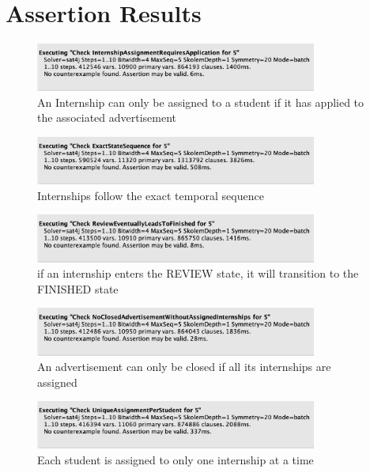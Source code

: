 \section{Assertion Results}

\begin{figure}[H]
    \centering
    \includegraphics[width=350px]{../assets/alloy-assertion/I-assertion.png}
    \caption*{An Internship can only be assigned to a student if it has applied to the associated advertisement}
\end{figure}

\begin{figure}[H]
    \centering
    \includegraphics[width=350px]{../assets/alloy-assertion/II-assertion.png}
    \caption*{Internships follow the exact temporal sequence}
\end{figure}

\begin{figure}[H]
    \centering
    \includegraphics[width=350px]{../assets/alloy-assertion/III-assertion.png}
    \caption*{if an internship enters the REVIEW state, it will transition to the FINISHED state}
\end{figure}

\begin{figure}[H]
    \centering
    \includegraphics[width=350px]{../assets/alloy-assertion/IV-assertion.png}
    \caption*{An advertisement can only be closed if all its internships are assigned}
\end{figure}

\begin{figure}[H]
    \centering
    \includegraphics[width=350px]{../assets/alloy-assertion/V-assertion.png}
    \caption*{Each student is assigned to only one internship at a time}
\end{figure}

